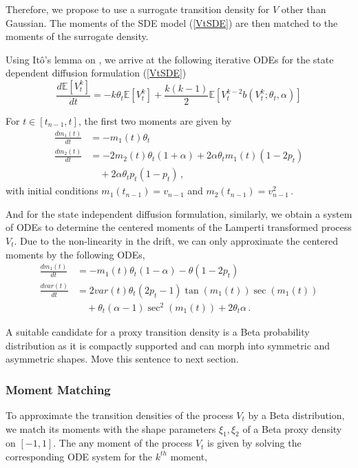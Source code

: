 \documentclass[11pt]{article}
\theoremstyle{definition}
\begin{document}
Therefore, we propose to use a surrogate transition density for $V$ other than Gaussian. The moments of the SDE model (\ref{VtSDE}) are then matched to the moments of the surrogate density. 

Using It\^o's lemma on , we arrive at the following iterative ODEs for the state dependent diffusion formulation (\ref{VtSDE})
\begin{equation}
\frac{d \mathbb{E}[ V^k_t]}{dt} = - k \theta_t \mathbb{E}[ V^k_t] + \frac{k(k-1)}{2} \mathbb{E}[ V^{k-2}_t  b(V^k_t;\theta_t, \alpha)]
\end{equation}

For $t\in [t_{n-1}, t]$, the first two moments are given by
\begin{align}
\frac{d m_1 (t)}{dt} &= - m_1(t)\theta_t   \nonumber \\
\frac{d m_2 (t)}{dt} &=  -2 m_2(t)\theta_t(1+\alpha) + 2\alpha\theta_t m_1(t)(1-2p_t)  \nonumber \\
&\quad + 2 \alpha\theta_t p_t (1-p_t) \,,
\end{align}
with initial conditions $m_1(t_{n-1})= v_{n-1}$ and $m_2(t_{n-1})= v_{n-1}^2 \,.$

And for the state independent diffusion formulation, similarly, we  obtain a system of ODEs to determine the centered moments of the Lamperti transformed process $V_t$. Due to the non-linearity in the drift, we can only approximate the centered moments by the following ODEs,
\begin{align}
\frac{d m_1 (t)}{dt} &= - m_1(t)\theta_t (1-\alpha) - \theta (1-2 p_t) \nonumber \\
\frac{d var(t)}{dt} &=  2 var(t) \theta_t (2p_t - 1 ) \tan(m_1 (t)) \sec(m_1 (t))   \nonumber \\
& \quad + \theta_t (\alpha - 1) \sec^2(m_1 (t))  + 2 \theta_t \alpha \,.
\end{align}

A suitable candidate for a proxy transition density is a Beta probability distribution as it is compactly supported and can morph into symmetric and asymmetric shapes. {\color{red} Move this sentence to next section.}

\subsubsection*{ Moment Matching}
To approximate the transition densities of  the process $V_t$ by a Beta distribution, we match its moments with the shape parameters $\xi_1, \xi_2$ of a Beta proxy density on $[-1,1]$. The any moment of the process $V_t$ is  given by solving the corresponding ODE system  for the $k^{th}$  moment,
\end{document}
